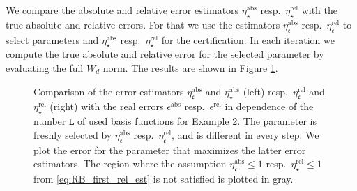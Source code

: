 \documentclass{article}
\theoremstyle{plain}
\theoremstyle{definition}
\theoremstyle{remark}
\newcommand{\RBestFineABS}{\eta_\star^\text{abs}}
\newcommand{\RBestFineREL}{\eta_\star^\text{rel}}
\newcommand{\RBestCcABS}{\eta_\mathfrak{c}^\text{abs}}
\newcommand{\RBestCcREL}{\eta_\mathfrak{c}^\text{rel}}
\begin{document}
We compare the absolute and relative error estimators $\RBestFineABS$ resp.~$\RBestFineREL$ with the true absolute and relative errors. For that we use the estimators $\RBestCcABS$ resp.~$\RBestCcREL$ to select parameters and $\RBestFineABS$ resp.~$\RBestFineREL$ for the certification. In each iteration we compute the true absolute and relative error for the selected parameter by evaluating the full $W_d$ norm. The results are shown in Figure \ref{fig:rberror2}.

\begin{figure}%
    \centering
{}
    \caption{Comparison of the error estimators $\RBestCcABS$ and $\RBestFineABS$ (left) resp.~$\RBestCcREL$ and $\RBestFineREL$ (right) with the real errors $\epsilon^\text{abs}$ resp.~$\epsilon^\text{rel}$ in dependence of the number $\texttt{L}$ of used basis functions for Example 2. The parameter is freshly selected by $\RBestCcABS$ resp.~$\RBestCcREL$, and is different in every step. We plot the error for the parameter that maximizes the latter error estimators. The region where the assumption $\RBestCcABS \leq 1$ resp.~$\RBestFineREL \leq 1$ from \eqref{eq:RB_first_rel_est} is not satisfied is plotted in gray.}\label{fig:rberror2}
\end{figure}
\end{document}
